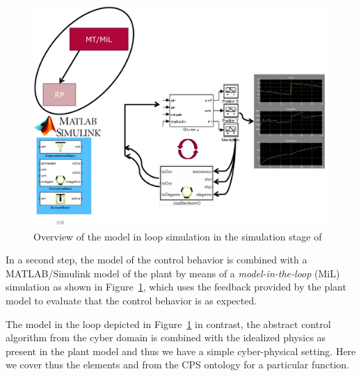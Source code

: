 \begin{figure}[!htb]
\centering
\includegraphics[scale=0.33]{figures/mil.pdf}
\caption{Overview of the model in loop simulation in the simulation stage of \cite{Broekman&Notenboom2003}}
\label{fig:mil}
\end{figure}


%
In a second step, the model of the control behavior is combined with a MATLAB/Simulink model of the plant by means of a \emph{model-in-the-loop} (MiL) simulation as shown in Figure~\ref{fig:mil}, which uses the feedback provided by the plant model to evaluate that the control behavior is as expected. 

%
The model in the loop depicted in Figure~\ref{fig:mil} in contrast, the abstract control algorithm from the cyber domain is combined with the idealized physics as present in the plant model and thus we have a simple cyber-physical setting. 
%
Here we cover thus the elements \CPSCyberPart and \CPSPhysicalPart from the CPS ontology for a particular function.



